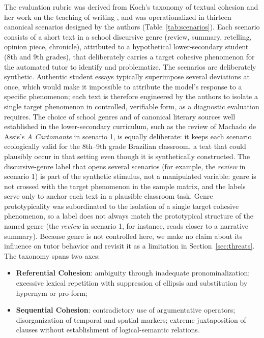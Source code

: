 \documentclass{sbc2023}%
\begin{document}
The evaluation rubric was derived from Koch's taxonomy of textual cohesion \citep{koch2018coesao,koch2020introducao} and her work on the teaching of writing \citep{kochelias2016escrever}, and was operationalized in thirteen canonical scenarios designed by the authors (Table~\ref{tab:scenarios}). Each scenario consists of a short text in a school discursive genre (review, summary, retelling, opinion piece, chronicle), attributed to a hypothetical lower-secondary student (8th and 9th grades), that deliberately carries a target cohesive phenomenon for the automated tutor to identify and problematize. The scenarios are deliberately synthetic. Authentic student essays typically superimpose several deviations at once, which would make it impossible to attribute the model's response to a specific phenomenon; each text is therefore engineered by the authors to isolate a single target phenomenon in controlled, verifiable form, as a diagnostic evaluation requires. The choice of school genres and of canonical literary sources well established in the lower-secondary curriculum, such as the review of Machado de Assis's \textit{A Cartomante} in scenario 1, is equally deliberate: it keeps each scenario ecologically valid for the 8th--9th grade Brazilian classroom, a text that could plausibly occur in that setting even though it is synthetically constructed. The discursive-genre label that opens several scenarios (for example, the \textit{review} in scenario 1) is part of the synthetic stimulus, not a manipulated variable: genre is not crossed with the target phenomenon in the sample matrix, and the labels serve only to anchor each text in a plausible classroom task. Genre prototypicality was subordinated to the isolation of a single target cohesive phenomenon, so a label does not always match the prototypical structure of the named genre (the \textit{review} in scenario 1, for instance, reads closer to a narrative summary). Because genre is not controlled here, we make no claim about its influence on tutor behavior and revisit it as a limitation in Section~\ref{sec:threats}. The taxonomy spans two axes:

\begin{itemize}
\item \textbf{Referential Cohesion}: ambiguity through inadequate pronominalization; excessive lexical repetition with suppression of ellipsis and substitution by hypernym or pro-form;
\item \textbf{Sequential Cohesion}: contradictory use of argumentative operators; disorganization of temporal and spatial markers; extreme juxtaposition of clauses without establishment of logical-semantic relations.
\end{itemize}
\end{document}
